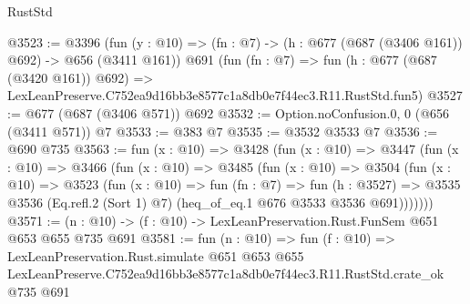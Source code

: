 \begin{lexlean}{RustStd}
\begin{coremodule}
@3523 := @3396
    (fun (y : @10) => (fn : @7) -> (h : @677 (@687 (@3406 @161)) @692) -> @656 (@3411 @161))
    @691
    (fun (fn : @7) =>
    fun (h : @677 (@687 (@3420 @161)) @692) =>
    LexLeanPreserve.C752ea9d16bb3e8577c1a8db0e7f44ec3.R11.RustStd.fun5)
@3527 := @677 (@687 (@3406 @571)) @692
@3532 := Option.noConfusion.{0, 0} (@656 (@3411 @571)) @7
@3533 := @383 @7
@3535 := @3532 @3533 @7
@3536 := @690 @735
@3563 := fun (x : @10) =>
  @3428
    (fun (x : @10) =>
    @3447
      (fun (x : @10) =>
      @3466
        (fun (x : @10) =>
        @3485
          (fun (x : @10) =>
          @3504
            (fun (x : @10) =>
            @3523
              (fun (x : @10) =>
              fun (fn : @7) =>
              fun (h : @3527) =>
              @3535 @3536 (Eq.refl.{2} (Sort 1) @7) (heq_of_eq.{1} @676 @3533 @3536 @691)))))))
@3571 := (n : @10) -> (f : @10) -> LexLeanPreservation.Rust.FunSem @651 @653 @655 @735 @691
@3581 := fun (n : @10) =>
  fun (f : @10) =>
  LexLeanPreservation.Rust.simulate
    @651
    @653
    @655
    LexLeanPreserve.C752ea9d16bb3e8577c1a8db0e7f44ec3.R11.RustStd.crate_ok
    @735
    @691
\end{coremodule}
\end{lexlean}
